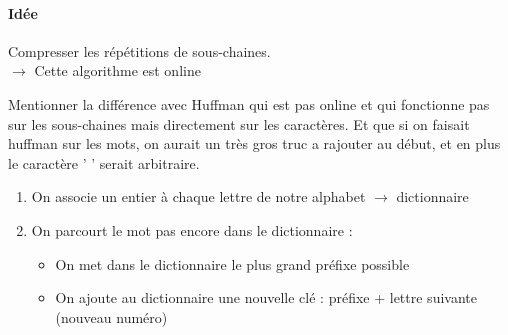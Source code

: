 
\paragraph{Idée} Compresser les répétitions de sous-chaines.\\
$\to$ Cette algorithme est online

\begin{com}
	Mentionner la différence avec Huffman qui est pas online et qui fonctionne pas sur les sous-chaines mais directement sur les caractères. Et que si on faisait huffman sur les mots, on aurait un très gros truc a rajouter au début, et en plus le caractère ' ' serait arbitraire.
\end{com}

\begin{enumerate}
	\item On associe un entier à chaque lettre de notre alphabet \quad $\to$ dictionnaire
	\item On parcourt le mot pas encore dans le dictionnaire : \begin{itemize}
		\item On met dans le dictionnaire le plus grand préfixe possible
		\item On ajoute au dictionnaire une nouvelle clé : préfixe + lettre suivante (nouveau numéro)
	\end{itemize}
\end{enumerate}

